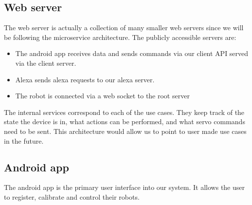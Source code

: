 \documentclass[onecolumn]{IEEEtran}
\begin{document}
\subsection{Web server}

The web server is actually a collection of many smaller web servers since we will be following the microservice architecture. The publicly accessible servers are:

\begin{itemize}
    \item The android app receives data and sends commands via our client API served via the client server. 
    \item Alexa sends alexa requests to our alexa server.
    \item The robot is connected via a web socket to the root server
\end{itemize}

The internal services correspond to each of the use cases. They keep track of the state the device is in, what actions can be performed, and what servo commands need to be sent. This architecture would allow us to point to user made use cases in the future.

\subsection{Android app}

The android app is the primary user interface into our system. It allows the user to register, calibrate and control their robots.
\end{document}
